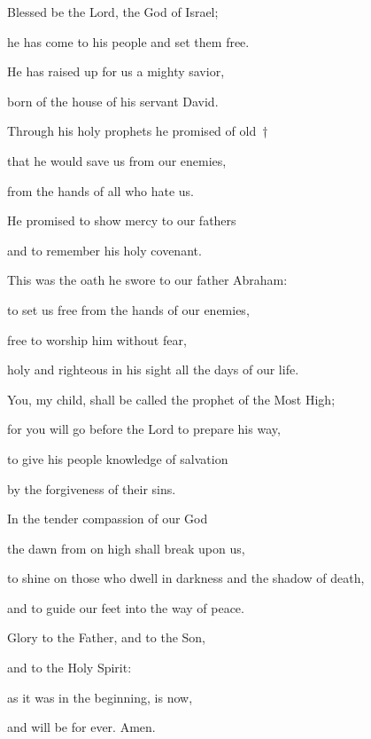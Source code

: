 \lettrine[loversize=0.15,lines=2]{B}{}lessed be the Lord, the God of Israel; ~\GreStar{}~\nopagebreak

\hspace{2pt} he has come to his people and set them free.

\noindent He has raised up for us a mighty savior,~\GreStar{}~\nopagebreak

born of the house of his servant David.

\noindent Through his holy prophets he promised of old~†~\nopagebreak

  that he would save us from our enemies,~\GreStar{}~\nopagebreak

  from the hands of all who hate us.

\noindent He promised to show mercy to our fathers~\GreStar{}~\nopagebreak


and to remember his holy covenant.

\noindent This was the oath he swore to our father Abraham:~\GreStar{}~\nopagebreak

to set us free from the hands of our enemies,

\noindent free to worship him without fear,~\GreStar{}~\nopagebreak

holy and righteous in his sight all the days of our life.

\noindent You, my child, shall be called the prophet of the Most High;~\GreStar{}~\nopagebreak

for you will go before the Lord to prepare his way,

\noindent to give his people knowledge of salvation~\GreStar{}~\nopagebreak


by the forgiveness of their sins.

\noindent In the tender compassion of our God~\GreStar{}~\nopagebreak


the dawn from on high shall break upon us,

\noindent to shine on those who dwell in darkness and the shadow of death,~\GreStar{}~\nopagebreak

and to guide our feet into the way of peace.

\noindent Glory to the Father, and to the Son,~\GreStar{}~\nopagebreak

and to the Holy Spirit:

\noindent as it was in the beginning, is now,~\GreStar{}~\nopagebreak

and will be for ever. Amen.
